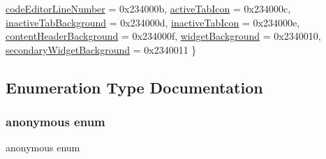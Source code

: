 \begin{DoxyCompactItemize}
\mbox{\hyperlink{namespaceColourIds_1_1jucer__CommonHeaders_a5ad0cf76718d01566ca67c5481641274ac2ceb959c9797805b88d37e6045daaf5}{code\+Editor\+Line\+Number}} = 0x234000b, 
\newline
\mbox{\hyperlink{namespaceColourIds_1_1jucer__CommonHeaders_a5ad0cf76718d01566ca67c5481641274a9ec6a9e5f61cc8d95334ddb8d725a0b3}{active\+Tab\+Icon}} = 0x234000c, 
\mbox{\hyperlink{namespaceColourIds_1_1jucer__CommonHeaders_a5ad0cf76718d01566ca67c5481641274a598865129cb4bd52fc3139c554b5db66}{inactive\+Tab\+Background}} = 0x234000d, 
\mbox{\hyperlink{namespaceColourIds_1_1jucer__CommonHeaders_a5ad0cf76718d01566ca67c5481641274a69ffcfd4e370239e1067f43cb2eccda8}{inactive\+Tab\+Icon}} = 0x234000e, 
\mbox{\hyperlink{namespaceColourIds_1_1jucer__CommonHeaders_a5ad0cf76718d01566ca67c5481641274af1d8c88cfcd81ffd9cab57a2e4e10810}{content\+Header\+Background}} = 0x234000f, 
\newline
\mbox{\hyperlink{namespaceColourIds_1_1jucer__CommonHeaders_a5ad0cf76718d01566ca67c5481641274a6339b91ef844b0b94bcc289872923240}{widget\+Background}} = 0x2340010, 
\mbox{\hyperlink{namespaceColourIds_1_1jucer__CommonHeaders_a5ad0cf76718d01566ca67c5481641274a517c612a714b26eccc58833f8d5f8e9a}{secondary\+Widget\+Background}} = 0x2340011
 \}
\end{DoxyCompactItemize}


\subsection{Enumeration Type Documentation}
\mbox{\label{namespaceColourIds_1_1jucer__CommonHeaders_a5ad0cf76718d01566ca67c5481641274}} 
\subsubsection{\texorpdfstring{anonymous enum}{anonymous enum}}
{\footnotesize\ttfamily anonymous enum}

